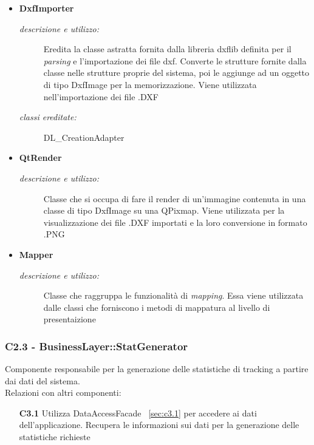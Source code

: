 \begin{itemize}
\begin{description}
\end{description}
\item \textbf{DxfImporter}
\begin{description}
\item [\textit{descrizione e utilizzo:}] Eredita la classe astratta fornita dalla libreria dxflib definita per il \textit{parsing} e l'importazione dei file dxf. Converte le strutture fornite dalla classe nelle strutture proprie del sistema, poi le aggiunge ad un oggetto di tipo DxfImage per la memorizzazione. Viene utilizzata nell'importazione dei file .DXF
\item [\textit{classi ereditate:}] DL_CreationAdapter
\end{description}
\item \textbf{QtRender}
\begin{description}
\item [\textit{descrizione e utilizzo:}] Classe che si occupa di fare il render di un'immagine contenuta in una classe di tipo DxfImage su una QPixmap. Viene utilizzata per la visualizzazione dei file .DXF importati e la loro conversione in formato .PNG
\end{description}
\item \textbf{Mapper}
\begin{description}
\item [\textit{descrizione e utilizzo:}] Classe che raggruppa le funzionalità di \textit{mapping}. Essa viene utilizzata dalle classi che forniscono i metodi di mappatura al livello di presentaizione
\end{description}
\end{itemize}

\subsubsection{C2.3 - BusinessLayer::StatGenerator} \label{sec:c2.3}
Componente responsabile per la generazione delle statistiche di tracking a partire dai dati del sistema. \\
Relazioni con altri componenti: 
\begin{itemize} 
\item [\textbf{C3.1}]
Utilizza DataAccessFacade ~\ref{sec:c3.1} per accedere ai dati dell'applicazione. Recupera le informazioni sui dati per la generazione delle statistiche richieste 
\end{itemize} 

